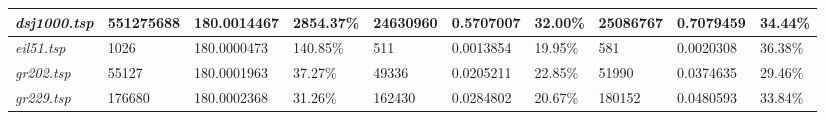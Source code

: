 \begin{landscape}
\begin{table}[]
\begin{tabular}{|l|l|l|l|l|l|l|l|l|l|}
  \textit{dsj1000.tsp}                                    & 551275688                               & 180.0014467                                                                           & 2854.37\%                                                                               & 24630960                                & 0.5707007                                                                              & 32.00\%                                                                                 & 25086767                                & 0.7079459                                                                             & 34.44\%                                                                                 \\ \hline
  \textit{eil51.tsp}                                      & 1026                                    & 180.0000473                                                                           & 140.85\%                                                                                & 511                                     & 0.0013854                                                                              & 19.95\%                                                                                 & 581                                     & 0.0020308                                                                             & 36.38\%                                                                                 \\ \hline
  \textit{gr202.tsp}                                      & 55127                                   & 180.0001963                                                                           & 37.27\%                                                                                 & 49336                                   & 0.0205211                                                                              & 22.85\%                                                                                 & 51990                                   & 0.0374635                                                                             & 29.46\%                                                                                 \\ \hline
  \textit{gr229.tsp}                                      & 176680                                  & 180.0002368                                                                           & 31.26\%                                                                                 & 162430                                  & 0.0284802                                                                              & 20.67\%                                                                                 & 180152                                  & 0.0480593                                                                             & 33.84\%                                                                                 \\ \hline

\end{tabular}
\end{table}
\end{landscape}
